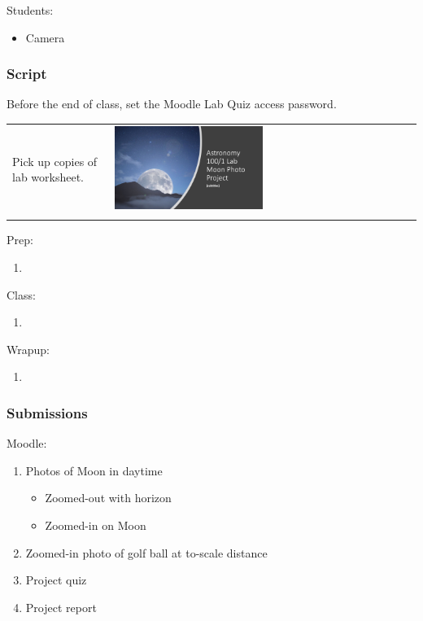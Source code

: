 \documentclass[12pt]{article}
\begin{document}
\noindent
Students:
\begin{itemize}
\item Camera
\end{itemize}


\subsubsection{Script}

Before the end of class, set the Moodle Lab Quiz access password.

\begin{longtable}{m{}m{}}
Pick up copies of lab worksheet. & \includegraphics[width=0.5\textwidth]{ppt/proj_moon/Slide1.jpeg}\\

\label{default}
\end{longtable}

Prep:
\begin{enumerate}
\item
\end{enumerate}

\noindent
Class:
\begin{enumerate}
\item
\end{enumerate}

\noindent
Wrapup:
\begin{enumerate}
\item
\end{enumerate}


\subsubsection{Submissions}

Moodle:
\begin{enumerate}
\item Photos of Moon in daytime
    \begin{itemize}
    \item Zoomed-out with horizon
    \item Zoomed-in on Moon
    \end{itemize}
\item Zoomed-in photo of golf ball at to-scale distance
\item Project quiz
\item Project report
\end{enumerate}
\end{document}
